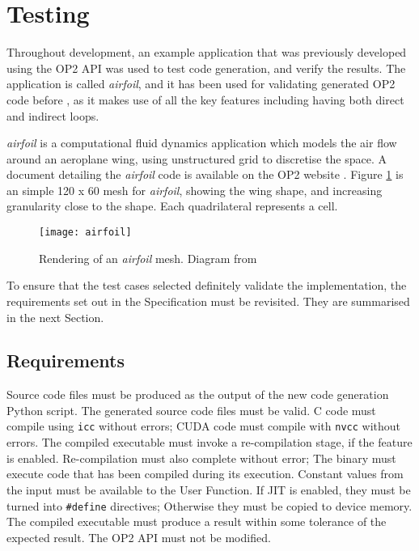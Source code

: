 
\section{Testing}
\label{s:test}
Throughout development, an example application that was previously developed using the OP2 API was used to test code generation, and verify the results. The application is called \textit{airfoil}, and it has been used for validating generated OP2 code before \cite{gpudesign}, as it makes use of all the key features including having both direct and indirect loops.
\par
\textit{airfoil} is a computational fluid dynamics application which models the air flow around an aeroplane wing, using unstructured grid to discretise the space. A document detailing the \textit{airfoil} code is available on the OP2 website \cite{airfoil}. Figure \ref{fig:airfoil_mesh} is an simple 120 x 60 mesh for \textit{airfoil}, showing the wing shape, and increasing granularity close to the shape. Each quadrilateral represents a cell.\par
\begin{figure}[h!]
  \centering
  \texttt{[image: airfoil]}
\caption{Rendering of an \textit{airfoil} mesh. Diagram from \cite{gpudesign}}
\label{fig:airfoil_mesh}
\end{figure}
\par
\vfill
\noindent To ensure that the test cases selected definitely validate the implementation, the requirements set out in the Specification must be revisited. They are summarised in the next Section.
\clearpage
\subsection{Requirements}
  \begin{outline}[enumerate]
  \1 Source code files must be produced as the output of the new code generation Python script.
  \1 The generated source code files must be valid.
  \2 C code must compile using \verb|icc| without errors;
  \2 CUDA code must compile with \verb|nvcc| without errors.
  \1 The compiled executable must invoke a re-compilation stage, if the feature is enabled.
  \2 Re-compilation must also complete without error;
  \2 The binary must execute code that has been compiled during its execution.
  \1 Constant values from the input must be available to the User Function.
  \2 If JIT is enabled, they must be turned into \verb|#define| directives;
  \2 Otherwise they must be copied to device memory.
  \1 The compiled executable must produce a result within some tolerance of the expected result.
  \1 The OP2 API must not be modified.
  \end{outline}

